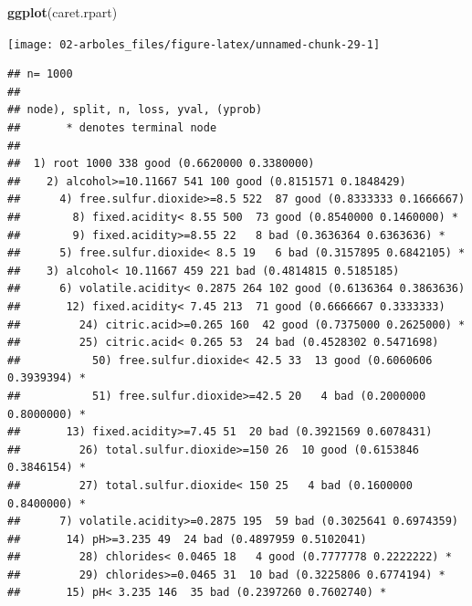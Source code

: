 \documentclass[
]{book}
\newenvironment{Shaded}{\begin{snugshade}}{\end{snugshade}}
\newcommand{\DataTypeTok}[1]{\textcolor[rgb]{0.13,0.29,0.53}{#1}}
\newcommand{\KeywordTok}[1]{\textcolor[rgb]{0.13,0.29,0.53}{\textbf{#1}}}
\newcommand{\NormalTok}[1]{#1}
\newcommand{\OperatorTok}[1]{\textcolor[rgb]{0.81,0.36,0.00}{\textbf{#1}}}
\newcommand{\StringTok}[1]{\textcolor[rgb]{0.31,0.60,0.02}{#1}}
\theoremstyle{break}
\theoremstyle{definition}
\theoremstyle{definition}
\theoremstyle{definition}
\theoremstyle{remark}
\begin{document}
\begin{Shaded}
\begin{Highlighting}[]
\KeywordTok{ggplot}\NormalTok{(caret.rpart)}
\end{Highlighting}
\end{Shaded}

\begin{center}\texttt{[image: 02-arboles\_files/figure-latex/unnamed-chunk-29-1]} \end{center}

\begin{Shaded}
\end{Shaded}

\begin{verbatim}
## n= 1000 
## 
## node), split, n, loss, yval, (yprob)
##       * denotes terminal node
## 
##  1) root 1000 338 good (0.6620000 0.3380000)  
##    2) alcohol>=10.11667 541 100 good (0.8151571 0.1848429)  
##      4) free.sulfur.dioxide>=8.5 522  87 good (0.8333333 0.1666667)  
##        8) fixed.acidity< 8.55 500  73 good (0.8540000 0.1460000) *
##        9) fixed.acidity>=8.55 22   8 bad (0.3636364 0.6363636) *
##      5) free.sulfur.dioxide< 8.5 19   6 bad (0.3157895 0.6842105) *
##    3) alcohol< 10.11667 459 221 bad (0.4814815 0.5185185)  
##      6) volatile.acidity< 0.2875 264 102 good (0.6136364 0.3863636)  
##       12) fixed.acidity< 7.45 213  71 good (0.6666667 0.3333333)  
##         24) citric.acid>=0.265 160  42 good (0.7375000 0.2625000) *
##         25) citric.acid< 0.265 53  24 bad (0.4528302 0.5471698)  
##           50) free.sulfur.dioxide< 42.5 33  13 good (0.6060606 0.3939394) *
##           51) free.sulfur.dioxide>=42.5 20   4 bad (0.2000000 0.8000000) *
##       13) fixed.acidity>=7.45 51  20 bad (0.3921569 0.6078431)  
##         26) total.sulfur.dioxide>=150 26  10 good (0.6153846 0.3846154) *
##         27) total.sulfur.dioxide< 150 25   4 bad (0.1600000 0.8400000) *
##      7) volatile.acidity>=0.2875 195  59 bad (0.3025641 0.6974359)  
##       14) pH>=3.235 49  24 bad (0.4897959 0.5102041)  
##         28) chlorides< 0.0465 18   4 good (0.7777778 0.2222222) *
##         29) chlorides>=0.0465 31  10 bad (0.3225806 0.6774194) *
##       15) pH< 3.235 146  35 bad (0.2397260 0.7602740) *
\end{verbatim}

\begin{Shaded}
\end{Shaded}
\end{document}
